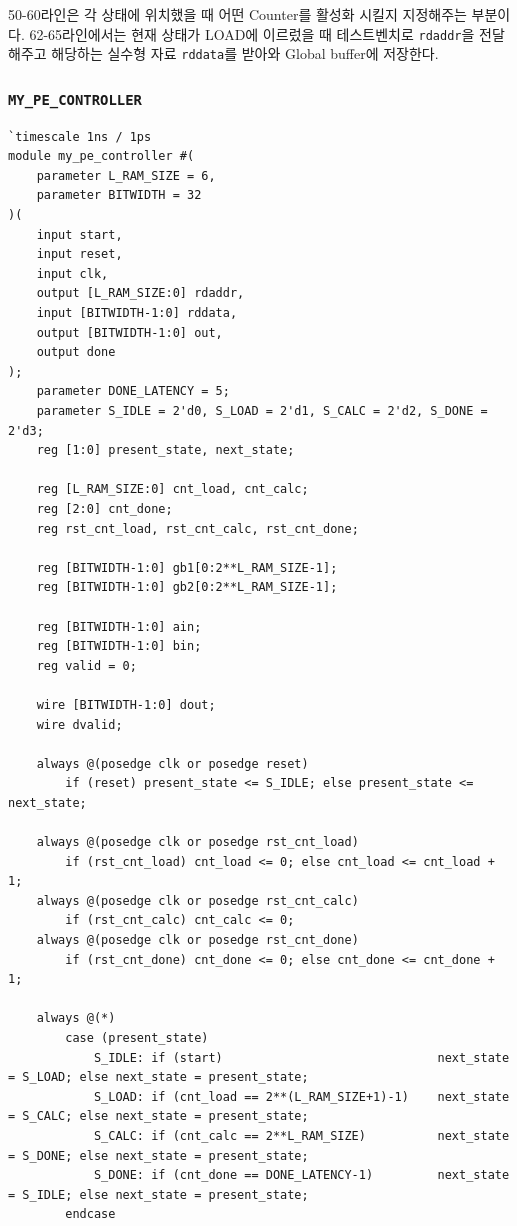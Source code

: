 \documentclass{article}
\begin{document}
\begin{itemize*}
\item 50-60라인은 각 상태에 위치했을 때 어떤 Counter를 활성화 시킬지 지정해주는 부분이다. 62-65라인에서는 현재 상태가 LOAD에 이르렀을 때 테스트벤치로 \texttt{rdaddr}을 전달해주고 해당하는 실수형 자료 \texttt{rddata}를 받아와 Global buffer에 저장한다.
\end{itemize*}


\subsubsection*{\texttt{MY\_PE\_CONTROLLER}}
\begin{lstlisting}[style={verilog-style}]
`timescale 1ns / 1ps
module my_pe_controller #(
    parameter L_RAM_SIZE = 6,
    parameter BITWIDTH = 32
)(
    input start,
    input reset,
    input clk,
    output [L_RAM_SIZE:0] rdaddr,
    input [BITWIDTH-1:0] rddata,
    output [BITWIDTH-1:0] out,
    output done
);
    parameter DONE_LATENCY = 5;
    parameter S_IDLE = 2'd0, S_LOAD = 2'd1, S_CALC = 2'd2, S_DONE = 2'd3;
    reg [1:0] present_state, next_state;
    
    reg [L_RAM_SIZE:0] cnt_load, cnt_calc;
    reg [2:0] cnt_done;
    reg rst_cnt_load, rst_cnt_calc, rst_cnt_done;
    
    reg [BITWIDTH-1:0] gb1[0:2**L_RAM_SIZE-1];
    reg [BITWIDTH-1:0] gb2[0:2**L_RAM_SIZE-1];
    
    reg [BITWIDTH-1:0] ain;
    reg [BITWIDTH-1:0] bin;
    reg valid = 0;
    
    wire [BITWIDTH-1:0] dout;
    wire dvalid;
    
    always @(posedge clk or posedge reset)
        if (reset) present_state <= S_IDLE; else present_state <= next_state;
        
    always @(posedge clk or posedge rst_cnt_load) 
        if (rst_cnt_load) cnt_load <= 0; else cnt_load <= cnt_load + 1;
    always @(posedge clk or posedge rst_cnt_calc) 
        if (rst_cnt_calc) cnt_calc <= 0;
    always @(posedge clk or posedge rst_cnt_done) 
        if (rst_cnt_done) cnt_done <= 0; else cnt_done <= cnt_done + 1;
    
    always @(*)
        case (present_state)
            S_IDLE: if (start)                              next_state = S_LOAD; else next_state = present_state;
            S_LOAD: if (cnt_load == 2**(L_RAM_SIZE+1)-1)    next_state = S_CALC; else next_state = present_state;
            S_CALC: if (cnt_calc == 2**L_RAM_SIZE)          next_state = S_DONE; else next_state = present_state;
            S_DONE: if (cnt_done == DONE_LATENCY-1)         next_state = S_IDLE; else next_state = present_state;
        endcase
    

\end{lstlisting}
\end{document}
